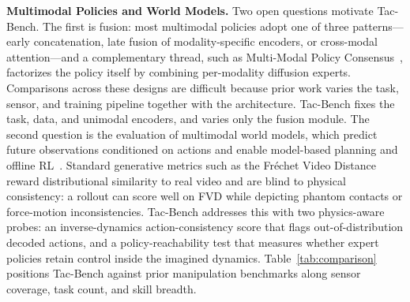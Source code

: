 \documentclass{article}
\begin{document}
\textbf{Multimodal Policies and World Models.}
Two open questions motivate Tac-Bench. The first is fusion: most multimodal policies adopt one of three patterns---early concatenation, late fusion of modality-specific encoders, or cross-modal attention---and a complementary thread, such as Multi-Modal Policy Consensus~\citep{chen2025consensus}, factorizes the policy itself by combining per-modality diffusion experts. Comparisons across these designs are difficult because prior work varies the task, sensor, and training pipeline together with the architecture. Tac-Bench fixes the task, data, and unimodal encoders, and varies only the fusion module. The second question is the evaluation of multimodal world models, which predict future observations conditioned on actions and enable model-based planning and offline RL~\cite{chen2025bimanual, hong2026scoop}. Standard generative metrics such as the Fr\'{e}chet Video Distance~\citep{unterthiner2018fvd} reward distributional similarity to real video and are blind to physical consistency: a rollout can score well on FVD while depicting phantom contacts or force-motion inconsistencies. Tac-Bench addresses this with two physics-aware probes: an inverse-dynamics action-consistency score that flags out-of-distribution decoded actions, and a policy-reachability test that measures whether expert policies retain control inside the imagined dynamics. Table~\ref{tab:comparison} positions Tac-Bench against prior manipulation benchmarks along sensor coverage, task count, and skill breadth. 
\end{document}
